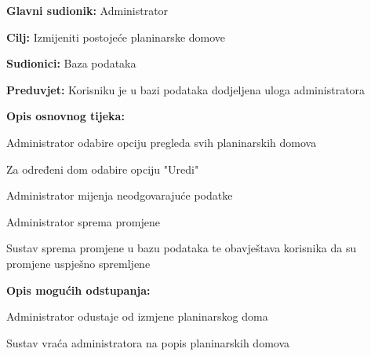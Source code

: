 		\noindent {}
		\begin{packed_item}
			
			\item \textbf{Glavni sudionik: }$ $Administrator$ $
			\item  \textbf{Cilj:} $ $Izmijeniti postojeće planinarske domove $ $
			\item  \textbf{Sudionici:} $ $Baza podataka $ $
			\item  \textbf{Preduvjet:} $ $Korisniku je u bazi podataka dodjeljena uloga administratora$ $
			\item  \textbf{Opis osnovnog tijeka:}
			
			\item[] \begin{packed_enum}
				
				\item $ $Administrator odabire opciju pregleda svih planinarskih domova$ $
				\item $ $Za određeni dom odabire opciju "Uredi" $ $
				\item $ $Administrator mijenja neodgovarajuće podatke$ $ 
				\item $ $Administrator sprema promjene$ $
				\item $ $Sustav sprema promjene u bazu podataka te obavještava korisnika da su promjene uspješno spremljene$ $
				
			\end{packed_enum}
		
				\item  \textbf{Opis mogućih odstupanja:}
			
			\item[] \begin{packed_item}
				
				\item[1.a] $ $Administrator odustaje od izmjene planinarskog doma$ $
				\item[] \begin{packed_enum}
					
					\item $ $Sustav vraća administratora na popis planinarskih domova$ $
				\end{packed_enum}
			\end{packed_item}
		\end{packed_item}
	
